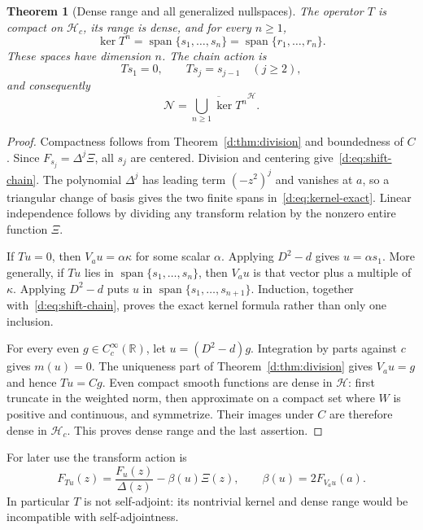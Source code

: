 \documentclass[11pt,a4paper]{article}
\numberwithin{equation}{section}
\newtheorem{theorem}{Theorem}[section]
\theoremstyle{definition}\newtheorem{definition}[theorem]{Definition}
\theoremstyle{remark}\newtheorem{remark}[theorem]{Remark}
\newcommand{\R}{\mathbb R}\newcommand{\C}{\mathbb C}\newcommand{\N}{\mathbb N}
\newcommand{\Hh}{\mathcal H}\newcommand{\Hw}{\mathcal H}
\newcommand{\Nn}{\mathcal N}\newcommand{\Ii}{\mathcal I}\newcommand{\Zz}{\mathcal Z}
\begin{document}
\begin{theorem}[Dense range and all generalized nullspaces]\label{d:thm:backward}
The operator $T$ is compact on $\Hh_c$, its range is dense, and for every $n\ge1$,
\begin{equation}\label{d:eq:kernel-exact}
 \ker T^n=\operatorname{span}\{s_1,\ldots,s_n\}
 =\operatorname{span}\{r_1,\ldots,r_n\}.
\end{equation}
These spaces have dimension $n$. The chain action is
\begin{equation}\label{d:eq:shift-chain}
 Ts_1=0,\qquad Ts_j=s_{j-1}\quad(j\ge2),
\end{equation}
and consequently
\begin{equation}\label{d:eq:N-generalized}
 \Nn=\overline{\bigcup_{n\ge1}\ker T^n}^{\Hh}.
\end{equation}
\end{theorem}
\begin{proof}
Compactness follows from Theorem~\ref{d:thm:division} and boundedness of $C$. Since $F_{s_j}=\Delta^j\Xi$, all $s_j$ are centered. Division and centering give~\eqref{d:eq:shift-chain}. The polynomial $\Delta^j$ has leading term $(-z^2)^j$ and vanishes at $a$, so a triangular change of basis gives the two finite spans in~\eqref{d:eq:kernel-exact}. Linear independence follows by dividing any transform relation by the nonzero entire function $\Xi$.

If $Tu=0$, then $V_au=\alpha\kappa$ for some scalar $\alpha$. Applying $D^2-d$ gives $u=\alpha s_1$. More generally, if $Tu$ lies in $\operatorname{span}\{s_1,\ldots,s_n\}$, then $V_au$ is that vector plus a multiple of $\kappa$. Applying $D^2-d$ puts $u$ in $\operatorname{span}\{s_1,\ldots,s_{n+1}\}$. Induction, together with~\eqref{d:eq:shift-chain}, proves the exact kernel formula rather than only one inclusion.

For every even $g\in C_c^\infty(\R)$, let $u=(D^2-d)g$. Integration by parts against $c$ gives $m(u)=0$. The uniqueness part of Theorem~\ref{d:thm:division} gives $V_au=g$ and hence $Tu=Cg$. Even compact smooth functions are dense in $\Hh$: first truncate in the weighted norm, then approximate on a compact set where $W$ is positive and continuous, and symmetrize. Their images under $C$ are therefore dense in $\Hh_c$. This proves dense range and the last assertion.
\end{proof}

For later use the transform action is
\begin{equation}\label{d:eq:T-transform}
 F_{Tu}(z)=\frac{F_u(z)}{\Delta(z)}-\beta(u)\Xi(z),\qquad
 \beta(u)=2F_{V_au}(a).
\end{equation}
In particular $T$ is not self-adjoint: its nontrivial kernel and dense range would be incompatible with self-adjointness.
\end{document}

